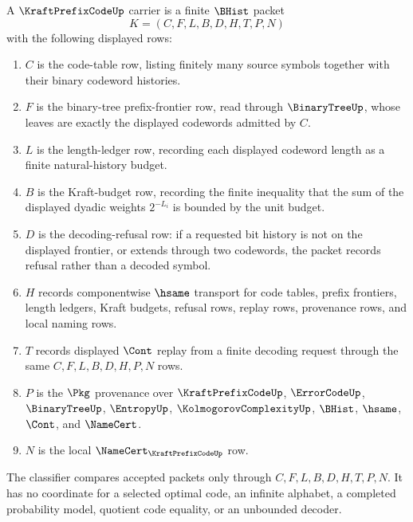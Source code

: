 \begin{definition}
\label{def:kraft-prefix-code-carrier}
A $\KraftPrefixCodeUp$ carrier is a finite $\BHist$ packet
$$
K=(C,F,L,B,D,H,T,P,N)
$$
with the following displayed rows:
\begin{enumerate}
\item $C$ is the code-table row, listing finitely many source symbols together with their binary codeword histories.
\item $F$ is the binary-tree prefix-frontier row, read through $\BinaryTreeUp$, whose leaves are exactly the displayed codewords admitted by $C$.
\item $L$ is the length-ledger row, recording each displayed codeword length as a finite natural-history budget.
\item $B$ is the Kraft-budget row, recording the finite inequality that the sum of the displayed dyadic weights $2^{-L_i}$ is bounded by the unit budget.
\item $D$ is the decoding-refusal row: if a requested bit history is not on the displayed frontier, or extends through two codewords, the packet records refusal rather than a decoded symbol.
\item $H$ records componentwise $\hsame$ transport for code tables, prefix frontiers, length ledgers, Kraft budgets, refusal rows, replay rows, provenance rows, and local naming rows.
\item $T$ records displayed $\Cont$ replay from a finite decoding request through the same $C,F,L,B,D,H,P,N$ rows.
\item $P$ is the $\Pkg$ provenance over $\KraftPrefixCodeUp$, $\ErrorCodeUp$, $\BinaryTreeUp$, $\EntropyUp$, $\KolmogorovComplexityUp$, $\BHist$, $\hsame$, $\Cont$, and $\NameCert$.
\item $N$ is the local $\NameCert_{\KraftPrefixCodeUp}$ row.
\end{enumerate}
The classifier compares accepted packets only through $C,F,L,B,D,H,T,P,N$. It has no coordinate for a selected optimal code, an infinite alphabet, a completed probability model, quotient code equality, or an unbounded decoder.
\end{definition}

